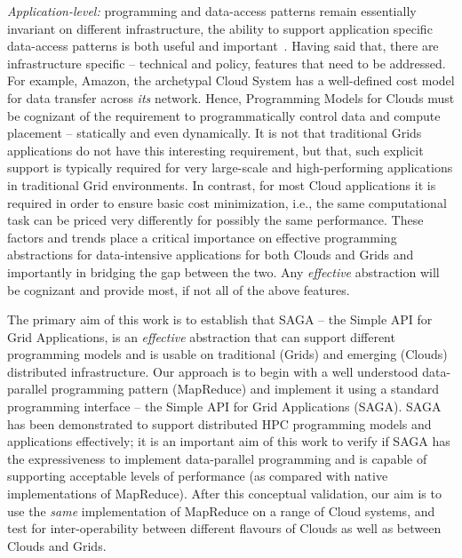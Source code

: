 \documentclass[conference,final]{IEEEtran}
\newcommand{\jhanote}[1]{ {\textcolor{red} { ***SJ: #1 }}}
\newcommand{\jhanote}[1]{}
\begin{document}
{\it Application-level:} programming and data-access patterns remain
essentially invariant on different infrastructure, the ability to
support application specific data-access patterns is both useful and
important~\cite{dpa-paper}.  Having said that, there are
infrastructure specific -- technical and policy, features that need to
be addressed. For example, Amazon, the archetypal Cloud System has a
well-defined cost model for data transfer across {\it its}
network. Hence, Programming Models for Clouds must be cognizant of the
requirement to programmatically control data and compute placement --
statically and even dynamically.  It is not that traditional Grids
applications do not have this interesting requirement, but that, such
explicit support is typically required for very
large-scale and high-performing applications in traditional Grid
environments. In contrast, for most Cloud applications it is required
in order to ensure basic cost minimization, i.e., the same
computational task can be priced very differently for possibly the
same performance.  These factors and trends place a critical
importance on effective programming abstractions for data-intensive
applications for both Clouds and Grids and importantly in bridging the
gap between the two.  Any {\it effective} abstraction will be
cognizant and provide most, if not all of the above features.

The primary aim of this work is to establish that SAGA -- the Simple
API for Grid Applications, is an {\it effective} abstraction that can
support different programming models and is usable on traditional
(Grids) and emerging (Clouds) distributed infrastructure.  Our
approach is to begin with a well understood data-parallel programming
pattern (MapReduce) and implement it using a standard programming
interface -- the Simple API for Grid Applications (SAGA).  SAGA has
been demonstrated to support distributed HPC programming models and
applications effectively; it is an important aim of this work to
verify if SAGA has the expressiveness to implement data-parallel
programming and is capable of supporting acceptable levels of
performance (as compared with native implementations of
MapReduce). After this conceptual validation, our aim is to use the
{\it same} implementation of MapReduce on a range of Cloud systems,
and test for inter-operability between different flavours of Clouds as
well as between Clouds and Grids.


\end{document}
